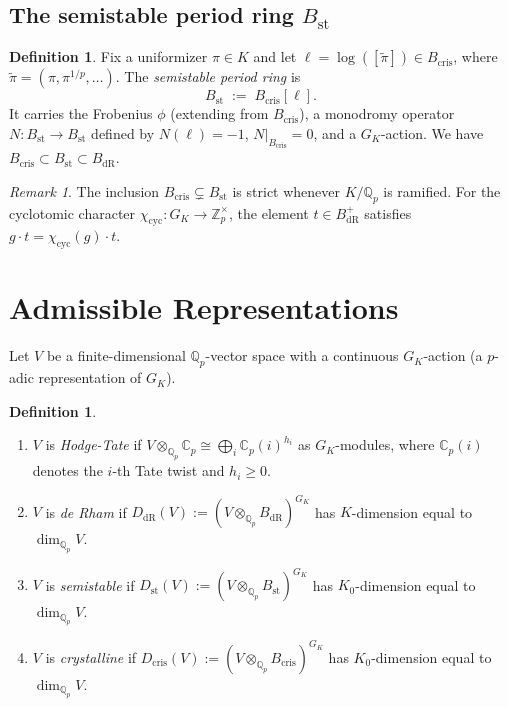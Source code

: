 \documentclass[12pt,a4paper]{amsart}
\theoremstyle{definition}
\newtheorem{definition}[theorem]{Definition}
\theoremstyle{remark}
\newtheorem{remark}[theorem]{Remark}
\newcommand{\Qp}{\mathbb{Q}_p}
\newcommand{\Zp}{\mathbb{Z}_p}
\newcommand{\BdR}{B_{\mathrm{dR}}}
\newcommand{\Bcris}{B_{\mathrm{cris}}}
\newcommand{\Bst}{B_{\mathrm{st}}}
\newcommand{\DdR}{D_{\mathrm{dR}}}
\newcommand{\Dcris}{D_{\mathrm{cris}}}
\newcommand{\Dst}{D_{\mathrm{st}}}
\begin{document}
\subsection{The semistable period ring $\Bst$}

\begin{definition}
  Fix a uniformizer $\pi \in K$ and let $\ell = \log([\widetilde{\pi}]) \in \Bcris$,
  where $\widetilde{\pi} = (\pi, \pi^{1/p},\ldots)$. The \emph{semistable period ring} is
  \[
    \Bst \;:=\; \Bcris[\ell].
  \]
  It carries the Frobenius $\phi$ (extending from $\Bcris$), a monodromy operator
  $N\colon \Bst \to \Bst$ defined by $N(\ell) = -1$, $N|_{\Bcris} = 0$, and a
  $G_K$-action. We have $\Bcris \subset \Bst \subset \BdR$.
\end{definition}

\begin{remark}
  The inclusion $\Bcris \subsetneq \Bst$ is strict whenever $K/\Qp$ is ramified.
  For the cyclotomic character $\chi_{\mathrm{cyc}}\colon G_K \to \Zp^\times$, the
  element $t \in \BdR^+$ satisfies $g \cdot t = \chi_{\mathrm{cyc}}(g) \cdot t$.
\end{remark}

\section{Admissible Representations}\label{sec:admissible}

Let $V$ be a finite-dimensional $\Qp$-vector space with a continuous $G_K$-action
(a $p$-adic representation of $G_K$).

\begin{definition}
  \begin{enumerate}[label=(\roman*)]
    \item $V$ is \emph{Hodge-Tate} if $V \otimes_{\Qp} \mathbb{C}_p \cong \bigoplus_i \mathbb{C}_p(i)^{h_i}$
      as $G_K$-modules, where $\mathbb{C}_p(i)$ denotes the $i$-th Tate twist and $h_i \geq 0$.
    \item $V$ is \emph{de Rham} if $\DdR(V) := (V \otimes_{\Qp} \BdR)^{G_K}$ has
      $K$-dimension equal to $\dim_{\Qp} V$.
    \item $V$ is \emph{semistable} if $\Dst(V) := (V \otimes_{\Qp} \Bst)^{G_K}$
      has $K_0$-dimension equal to $\dim_{\Qp} V$.
    \item $V$ is \emph{crystalline} if $\Dcris(V) := (V \otimes_{\Qp} \Bcris)^{G_K}$
      has $K_0$-dimension equal to $\dim_{\Qp} V$.
  \end{enumerate}
\end{definition}
\end{document}
